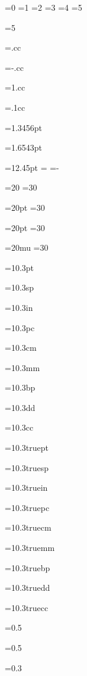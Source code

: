 
=0
=1
=2
=3
=4
=5

=5
\showthe{}

=.cc
\showthe{}

=-.cc
\showthe{}

=1.cc
\showthe{}

=.1cc
\showthe{}

=1.3456pt
\showthe{}

=1.6543pt
\showthe{}

=12.45pt
\showthe{}
=
\showthe{}
=-
\showthe{}

=20
=30
\showthe{}

=20pt
=30
\showthe{}

=20pt
=30
\showthe{}

=20mu
=30
\showthe{}

=10.3pt
\showthe{}

=10.3sp
\showthe{}

=10.3in
\showthe{}

=10.3pc
\showthe{}

=10.3cm
\showthe{}

=10.3mm
\showthe{}

=10.3bp
\showthe{}

=10.3dd
\showthe{}

=10.3cc
\showthe{}


=10.3truept
\showthe{}

=10.3truesp
\showthe{}

=10.3truein
\showthe{}

=10.3truepc
\showthe{}

=10.3truecm
\showthe{}

=10.3truemm
\showthe{}

=10.3truebp
\showthe{}

=10.3truedd
\showthe{}

=10.3truecc
\showthe{}

=0.5
\showthe{}

=0.5
\showthe{}

=0.3
\showthe{}

